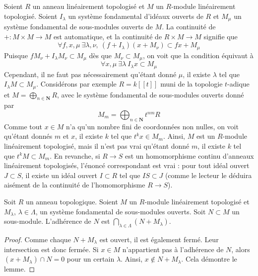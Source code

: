 \begin{example}
\label{example-what-does-it-mean}
Soient $R$ un anneau linéairement topologisé et $M$ un
$R$-module linéairement topologisé. Soient $I_\lambda$ un système fondamental
d'idéaux ouverts de $R$ et $M_\mu$ un système fondamental de
sous-modules ouverts de $M$. La continuité de $+ : M \times M \to M$
est automatique, et la continuité de $R \times M \to M$ signifie que
$$
\forall f, x, \mu\ \exists \lambda, \nu,\ (f + I_\lambda)(x + M_\nu)
\subset fx + M_\mu
$$
Puisque $fM_\nu + I_\lambda M_\nu \subset M_\mu$ dès que
$M_\nu \subset M_\mu$, on voit que la condition équivaut à
$$
\forall x, \mu\ \exists \lambda\ I_\lambda x \subset M_\mu
$$
Cependant, il ne faut pas nécessairement qu'étant donné $\mu$, il existe $\lambda$
tel que $I_\lambda M \subset M_\mu$. Considérons par exemple
$R = k[[t]]$ muni de la topologie $t$-adique et
$M = \bigoplus_{n \in \mathbf{N}} R$, avec le système fondamental de
sous-modules ouverts donné par
$$
M_m = \bigoplus\nolimits_{n \in \mathbf{N}} t^{nm}R
$$
Comme tout $x \in M$ n'a qu'un nombre fini de coordonnées non nulles, on voit
qu'étant donnés $m$ et $x$, il existe $k$ tel que $t^k x \in M_m$.
Ainsi, $M$ est un $R$-module linéairement topologisé, mais il n'est pas vrai
qu'étant donné $m$, il existe $k$ tel que $t^kM \subset M_m$.
En revanche, si $R \to S$ est un homomorphisme continu d'anneaux
linéairement topologisés, l'énoncé correspondant est vrai :
pour tout idéal ouvert $J \subset S$, il existe un idéal ouvert
$I \subset R$ tel que $IS \subset J$ (comme le lecteur le déduira aisément
de la continuité de l'homomorphisme $R \to S$).
\end{example}

\begin{lemma}
\label{lemma-closed}
Soit $R$ un anneau topologique. Soient $M$ un $R$-module linéairement
topologisé et $M_\lambda$, $\lambda \in \Lambda$, un système fondamental
de sous-modules ouverts. Soit $N \subset M$ un sous-module.
L'adhérence de $N$ est $\bigcap_{\lambda \in \Lambda} (N + M_\lambda)$.
\end{lemma}

\begin{proof}
Comme chaque $N + M_\lambda$ est ouvert, il est également fermé. Leur
intersection est donc fermée. Si $x \in M$ n'appartient pas à l'adhérence de $N$,
alors $(x + M_\lambda) \cap N = 0$ pour un certain $\lambda$. Ainsi,
$x \not \in N + M_\lambda$. Cela démontre le lemme.
\end{proof}

